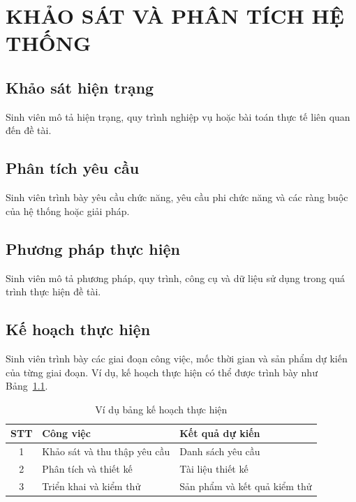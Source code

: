 \setcounter{chapter}{1}
\setcounter{chapter}{1} 
\setcounter{table}{0}
\setcounter{figure}{0}
\chapter{KHẢO SÁT VÀ PHÂN TÍCH HỆ THỐNG}


\section{Khảo sát hiện trạng}
Sinh viên mô tả hiện trạng, quy trình nghiệp vụ hoặc bài toán thực tế liên quan đến đề tài.

\section{Phân tích yêu cầu}
Sinh viên trình bày yêu cầu chức năng, yêu cầu phi chức năng và các ràng buộc của hệ thống hoặc giải pháp.

\section{Phương pháp thực hiện}
Sinh viên mô tả phương pháp, quy trình, công cụ và dữ liệu sử dụng trong quá trình thực hiện đề tài.

\section{Kế hoạch thực hiện}
Sinh viên trình bày các giai đoạn công việc, mốc thời gian và sản phẩm dự kiến của từng giai đoạn.
Ví dụ, kế hoạch thực hiện có thể được trình bày như Bảng~\ref{tab:ke-hoach}.

\begin{table}[H]
\centering
\caption{Ví dụ bảng kế hoạch thực hiện}
\label{tab:ke-hoach}
\begin{tabular}{|c|p{5cm}|p{5cm}|}
\hline
\textbf{STT} & \textbf{Công việc} & \textbf{Kết quả dự kiến} \\
\hline
1 & Khảo sát và thu thập yêu cầu & Danh sách yêu cầu \\
\hline
2 & Phân tích và thiết kế & Tài liệu thiết kế \\
\hline
3 & Triển khai và kiểm thử & Sản phẩm và kết quả kiểm thử \\
\hline
\end{tabular}
\end{table}



